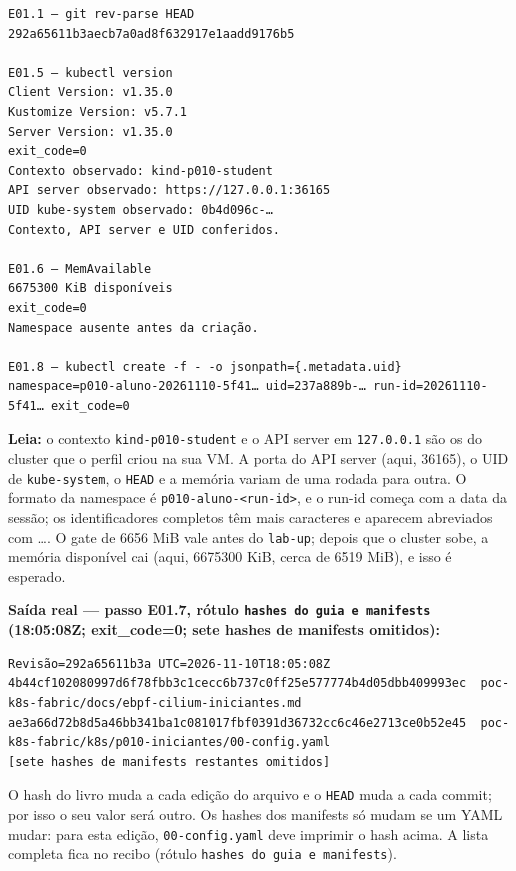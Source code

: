 \documentclass[12pt,openany,oneside,a4paper,chapter=TITLE,english,brazil]{abntex2}
\begin{document}
\begin{verbatim}
E01.1 — git rev-parse HEAD
292a65611b3aecb7a0ad8f632917e1aadd9176b5

E01.5 — kubectl version
Client Version: v1.35.0
Kustomize Version: v5.7.1
Server Version: v1.35.0
exit_code=0
Contexto observado: kind-p010-student
API server observado: https://127.0.0.1:36165
UID kube-system observado: 0b4d096c-…
Contexto, API server e UID conferidos.

E01.6 — MemAvailable
6675300 KiB disponíveis
exit_code=0
Namespace ausente antes da criação.

E01.8 — kubectl create -f - -o jsonpath={.metadata.uid}
namespace=p010-aluno-20261110-5f41… uid=237a889b-… run-id=20261110-5f41… exit_code=0
\end{verbatim}

\textbf{Leia:} o contexto \texttt{kind-{}\allowbreak{}p010-{}\allowbreak{}student} e o API server em \texttt{127.\allowbreak{}0.\allowbreak{}0.\allowbreak{}1} são os do cluster que o perfil criou na sua VM. A porta do API server (aqui, 36165), o UID de \texttt{kube-{}\allowbreak{}system}, o \texttt{HEAD} e a memória variam de uma rodada para outra. O formato da namespace é \texttt{p010-{}\allowbreak{}aluno-{}\allowbreak{}\textless{}run-{}\allowbreak{}id\textgreater{}}, e o run-id começa com a data da sessão; os identificadores completos têm mais caracteres e aparecem abreviados com \ldots. O gate de 6656 MiB vale antes do \texttt{lab-{}\allowbreak{}up}; depois que o cluster sobe, a memória disponível cai (aqui, 6675300 KiB, cerca de 6519 MiB), e isso é esperado.

\clearpage

\textbf{Saída real --- passo E01.7, rótulo \texttt{hashes do guia e manifests} (18:05:08Z; exit\_code=0; sete hashes de manifests omitidos):}

\begin{verbatim}
Revisão=292a65611b3a UTC=2026-11-10T18:05:08Z
4b44cf102080997d6f78fbb3c1cecc6b737c0ff25e577774b4d05dbb409993ec  poc-k8s-fabric/docs/ebpf-cilium-iniciantes.md
ae3a66d72b8d5a46bb341ba1c081017fbf0391d36732cc6c46e2713ce0b52e45  poc-k8s-fabric/k8s/p010-iniciantes/00-config.yaml
[sete hashes de manifests restantes omitidos]
\end{verbatim}

O hash do livro muda a cada edição do arquivo e o \texttt{HEAD} muda a cada commit; por isso o seu valor será outro. Os hashes dos manifests só mudam se um YAML mudar: para esta edição, \texttt{00-{}\allowbreak{}config.\allowbreak{}yaml} deve imprimir o hash acima. A lista completa fica no recibo (rótulo \texttt{hashes do guia e manifests}).
\end{document}
